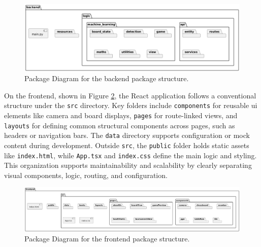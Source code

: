 \begin{figure}[h!]
    \centering
    \includegraphics[width=\linewidth]{figures/results/uml/package-backend.png}
    \caption[Package Diagram for Backend]{Package Diagram for the backend package structure.}
    \label{fig:package-backend}
\end{figure}

\newpage

On the frontend, shown in Figure \ref{fig:package-frontend}, the React application follows a conventional structure under the \texttt{src} directory. Key folders include \texttt{components} for reusable \gls{ui} elements like camera and board displays, \texttt{pages} for route-linked views, and \texttt{layouts} for defining common structural components across pages, such as headers or navigation bars. The \texttt{data} directory supports configuration or mock content during development. Outside \texttt{src}, the \texttt{public} folder holds static assets like \texttt{index.html}, while \texttt{App.tsx} and \texttt{index.css} define the main logic and styling. This organization supports maintainability and scalability by clearly separating visual components, logic, routing, and configuration.

\begin{figure}[h!]
    \centering
    \includegraphics[width=\linewidth]{figures/results/uml/package-frontend.png}
    \caption[Package Diagram for Frontend]{Package Diagram for the frontend package structure.}
    \label{fig:package-frontend}
\end{figure}

\newpage

